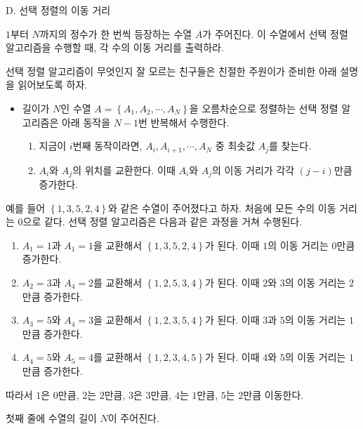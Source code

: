 \def\probtitle{선택 정렬의 이동 거리}
\def\probno{D}

\begin{problem}{\probno{}. \probtitle{}}

$1$부터 $N$까지의 정수가 한 번씩 등장하는 수열 $A$가 주어진다. 이 수열에서 선택 정렬 알고리즘을 수행할 때, 각 수의 이동 거리를 출력하라.

선택 정렬 알고리즘이 무엇인지 잘 모르는 친구들은 친절한 주원이가 준비한 아래 설명을 읽어보도록 하자. \\

\begin{itemize}
\item 길이가 $N$인 수열 $A = \left\{A_1, A_2, \cdots, A_N \right\}$을 오름차순으로 정렬하는 선택 정렬 알고리즘은 아래 동작을 $N-1$번 반복해서 수행한다.

\begin{enumerate}[noitemsep,topsep=0pt]
    \item 지금이 $i$번째 동작이라면, $A_i, A_{i+1}, \cdots, A_N$ 중 최솟값 $A_j$를 찾는다.
    \item $A_i$와 $A_j$의 위치를 교환한다. 이때 $A_i$와 $A_j$의 이동 거리가 각각 $(j-i)$만큼 증가한다. 
\end{enumerate}
\end{itemize}

예를 들어 $\left\{ 1, 3, 5, 2, 4 \right\}$와 같은 수열이 주어졌다고 하자. 처음에 모든 수의 이동 거리는 $0$으로 같다. 선택 정렬 알고리즘은 다음과 같은 과정을 거쳐 수행된다.

\begin{enumerate}[noitemsep]
    \item $A_1=1$과 $A_1=1$을 교환해서 $\left\{ 1, 3, 5, 2, 4 \right\}$가 된다. 이때 $1$의 이동 거리는 $0$만큼 증가한다.
    \item $A_2=3$과 $A_4=2$를 교환해서 $\left\{ 1, 2, 5, 3, 4 \right\}$가 된다. 이때 $2$와 $3$의 이동 거리는 $2$만큼 증가한다.
    \item $A_3=5$와 $A_4=3$을 교환해서 $\left\{ 1, 2, 3, 5, 4 \right\}$가 된다. 이때 $3$과 $5$의 이동 거리는 $1$만큼 증가한다.
    \item $A_4=5$와 $A_5=4$를 교환해서 $\left\{ 1, 2, 3, 4, 5 \right\}$가 된다. 이때 $4$와 $5$의 이동 거리는 $1$만큼 증가한다.
\end{enumerate}

따라서 $1$은 $0$만큼, $2$는 $2$만큼, $3$은 3만큼, $4$는 $1$만큼, $5$는 $2$만큼 이동한다.

\InputFile

첫째 줄에 수열의 길이 $N$이 주어진다.


\end{problem}
